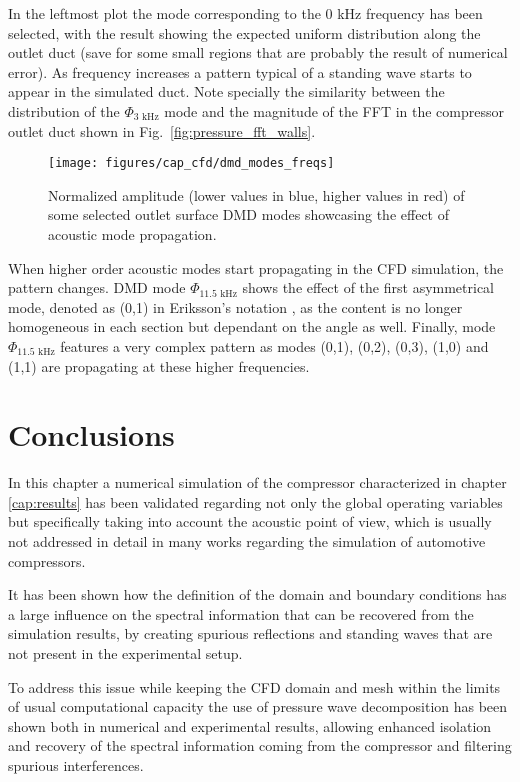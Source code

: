 In the leftmost plot the mode corresponding to the 0 kHz frequency has been selected, with the result showing the expected uniform distribution along the outlet duct (save for some small regions that are probably the result of numerical error). As frequency increases a pattern typical of a standing wave starts to appear in the simulated duct. Note specially the similarity between the distribution of the $\Phi_\text{3 kHz}$ mode and the magnitude of the FFT in the compressor outlet duct shown in Fig.~\ref{fig:pressure_fft_walls}. 

\begin{figure}[t!]
\centering
\texttt{[image: figures/cap\_cfd/dmd\_modes\_freqs]}
\caption{Normalized amplitude (lower values in blue, higher values in red) of some selected outlet surface DMD modes showcasing the effect of acoustic mode propagation.}
\label{fig:dmd_modes_freqs}
\end{figure}

When higher order acoustic modes start propagating in the CFD simulation, the pattern changes. DMD mode $\Phi_\text{11.5 kHz}$ shows the effect of the first asymmetrical mode, denoted as (0,1) in Eriksson's notation \cite{eriksson1980higher}, as the content is no longer homogeneous in each section but dependant on the angle as well. Finally, mode $\Phi_\text{11.5 kHz}$ features a very complex pattern as modes (0,1), (0,2), (0,3), (1,0) and (1,1) are propagating at these higher frequencies.

\section{Conclusions}

In this chapter a numerical simulation of the compressor characterized in chapter \ref{cap:results} has been validated regarding not only the global operating variables but specifically taking into account the acoustic point of view, which is usually not addressed in detail in many works regarding the simulation of automotive compressors.

It has been shown how the definition of the domain and boundary conditions has a large influence on the spectral information that can be recovered from the simulation results, by creating spurious reflections and standing waves that are not present in the experimental setup.

To address this issue while keeping the CFD domain and mesh within the limits of usual computational capacity the use of pressure wave decomposition has been shown both in numerical and experimental results, allowing enhanced isolation and recovery of the spectral information coming from the compressor and filtering spurious interferences.

